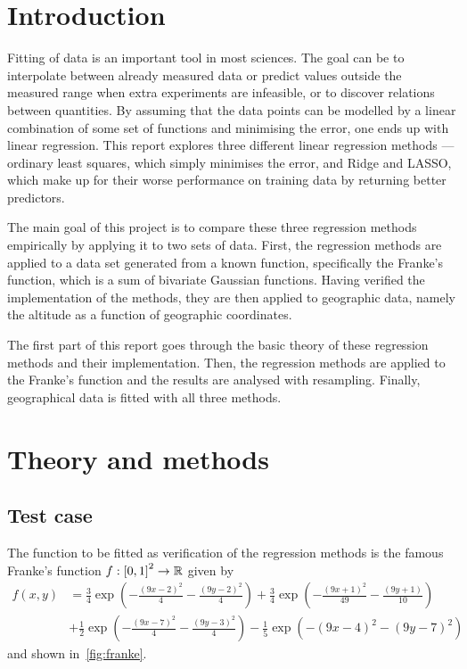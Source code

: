 \documentclass[11pt,british,a4paper]{article}
\let\oldexp=\exp
\renewcommand{\exp}[1]{\mathrm{e}^{#1}}
\numberwithin{equation}{section}
\begin{document}
\section{Introduction}
Fitting of data is an important tool in most sciences.
The goal can be to interpolate between already measured data or predict values outside the measured range when extra experiments are infeasible, or to discover relations between quantities.
By assuming that the data points can be modelled by a linear combination of some set of functions and minimising the error, one ends up with linear regression.
This report explores three different linear regression methods --- ordinary least squares, which simply minimises the error, and Ridge and LASSO, which make up for their worse performance on training data by returning better predictors.

The main goal of this project is to compare these three regression methods empirically by applying it to two sets of data.
First, the regression methods are applied to a data set generated from a known function, specifically the Franke's function, which is a sum of bivariate Gaussian functions.
Having verified the implementation of the methods, they are then applied to geographic data, namely the altitude as a function of geographic coordinates.

The first part of this report goes through the basic theory of these regression methods and their implementation.
Then, the regression methods are applied to the Franke's function and the results are analysed with resampling. Finally, geographical data is fitted with all three methods.

\section{Theory and methods}

\subsection{Test case}
The function to be fitted as verification of the regression methods is the famous Franke's function \(f:\qty[0,1]^2\to\mathbb{R}\) given by
\begin{equation}
    \begin{alignedat}{2}
        f(x,y) &= \frac{3}{4}\oldexp(-\frac{(9x-2)^2}{4} - \frac{(9y-2)^2}{4})
                + \frac{3}{4}\oldexp(-\frac{(9x+1)^2}{49}- \frac{(9y+1)}{10} ) \\
               &+ \frac{1}{2}\oldexp(-\frac{(9x-7)^2}{4} - \frac{(9y-3)^2}{4})
                - \frac{1}{5}\oldexp(-(9x-4)^2 - (9y-7)^2)
    \end{alignedat}\label{eq:franke}
\end{equation}
and shown in~\vref{fig:franke}.
\end{document}
